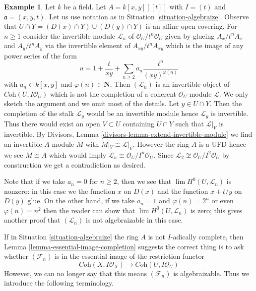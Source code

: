 \documentclass{stacks-project}
\theoremstyle{plain}
\theoremstyle{definition}
\newtheorem{example}[subsection]{Example}
\theoremstyle{remark}
\numberwithin{equation}{subsection}
\def\lim{\mathop{\mathrm{lim}}\nolimits}
\begin{document}
\begin{example}
\label{example-not-algebraizable}
Let $k$ be a field. Let $A = k[x, y][[t]]$ with $I = (t)$ and
$\mathfrak a = (x, y, t)$. Let us use notation as in
Situation \ref{situation-algebraize}. Observe that
$U \cap Y = (D(x) \cap Y) \cup (D(y) \cap Y)$ is an affine
open covering. For $n \geq 1$ consider the invertible
module $\mathcal{L}_n$ of $\mathcal{O}_U/t^n\mathcal{O}_U$
given by glueing $A_x/t^nA_x$ and $A_y/t^nA_y$ via the invertible
element of $A_{xy}/t^nA_{xy}$ which is the image of any power series
of the form
$$
u = 1 + \frac{t}{xy} + \sum_{n \geq 2} a_n \frac{t^n}{(xy)^{\varphi(n)}}
$$
with $a_n \in k[x, y]$ and $\varphi(n) \in \mathbf{N}$.
Then $(\mathcal{L}_n)$ is an invertible object of
$\textit{Coh}(U, I\mathcal{O}_U)$ which is not the
completion of a coherent $\mathcal{O}_U$-module $\mathcal{L}$.
We only sketch the argument and we omit most of the details.
Let $y \in U \cap Y$. Then the completion of the stalk
$\mathcal{L}_y$ would be an invertible module hence $\mathcal{L}_y$
is invertible. Thus there would exist an open $V \subset U$
containing $U \cap Y$ such that $\mathcal{L}|_V$ is invertible.
By Divisors, Lemma \ref{divisors-lemma-extend-invertible-module}
we find an invertible $A$-module $M$ with
$\widetilde{M}|_V \cong \mathcal{L}|_V$. However the ring $A$
is a UFD hence we see $M \cong A$ which would imply
$\mathcal{L}_n \cong \mathcal{O}_U/I^n\mathcal{O}_U$.
Since $\mathcal{L}_2 \not \cong \mathcal{O}_U/I^2\mathcal{O}_U$
by construction we get a contradiction as desired.

\medskip\noindent
Note that if we take $a_n = 0$ for $n \geq 2$, then we see
that $\lim H^0(U, \mathcal{L}_n)$ is nonzero: in this case
we the function $x$ on $D(x)$ and the function $x + t/y$ on $D(y)$
glue. On the other hand, if we take $a_n = 1$ and $\varphi(n) = 2^n$
or even $\varphi(n) = n^2$ then the reader can show that
$\lim H^0(U, \mathcal{L}_n)$ is zero; this gives another proof
that $(\mathcal{L}_n)$ is not algebraizable in this case.
\end{example}

\noindent
If in Situation \ref{situation-algebraize} the ring $A$ is not
$I$-adically complete, then Lemma \ref{lemma-essential-image-completion}
suggests the correct thing is to ask whether $(\mathcal{F}_n)$
is in the essential image of the restriction functor
$$
\textit{Coh}(X, I\mathcal{O}_X)
\longrightarrow
\textit{Coh}(U, I\mathcal{O}_U)
$$
However, we can no longer say that this means $(\mathcal{F}_n)$
is algebraizable. Thus we introduce the following terminology.
\end{document}
